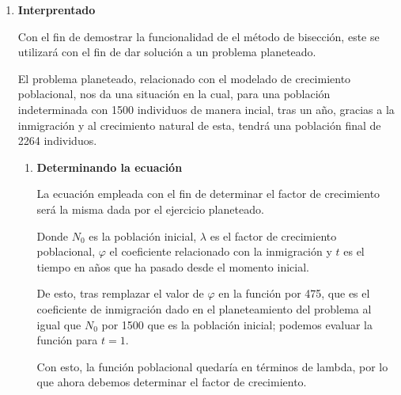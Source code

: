 \documentclass[english,notitlepage,letterpaper, 10pt]{article} %
\begin{document}
\begin{enumerate}
\begin{enumerate}
    \end{enumerate}

    \item \textbf{Interprentado}
  
    Con el fin de demostrar la funcionalidad de el método de bisección, este se utilizará con el fin de dar solución a un problema planeteado.

    El problema planeteado, relacionado con el modelado de crecimiento poblacional, nos da una situación en la cual, para una población indeterminada con 1500 individuos de manera incial, tras un año, gracias a la inmigración y al crecimiento natural de esta, tendrá una población final de 2264 individuos.

    \begin{enumerate}
      \item \textbf{Determinando la ecuación}
      
      La ecuación empleada con el fin de determinar el factor de crecimiento será la misma dada por el ejercicio planeteado. 

      \begin{center}
      \end{center}

      Donde $N_0$ es la población inicial, $\lambda$ es el factor de crecimiento poblacional, $\varphi$ el coeficiente relacionado con la inmigración y $t$ es el tiempo en años que ha pasado desde el momento inicial.

      De esto, tras remplazar el valor de $\varphi$ en la función por 475, que es el coeficiente de inmigración dado en el planeteamiento del problema al igual que $N_0$ por 1500 que es la población inicial; podemos evaluar la función para $t = 1$.

      \begin{center}
      \end{center}

      Con esto, la función poblacional quedaría en términos de lambda, por lo que ahora debemos determinar el factor de crecimiento. 

      \begin{center}
      \end{center}
    

\end{enumerate}
\end{enumerate}
\end{document}
